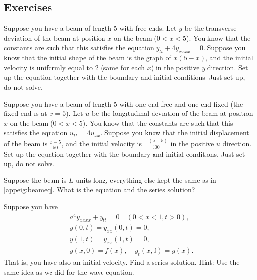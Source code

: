 \documentclass[12pt]{book}
\begin{document}
\subsection{Exercises}

\begin{exercise}
Suppose you have a beam of length 5 with free ends.  Let $y$ be the
transverse deviation of the beam at position $x$ on the beam ($0 < x < 5$).
You know that the
constants are such that this satisfies the equation $y_{tt} + 4 y_{xxxx} =
0$.   Suppose you know that the initial shape of the beam is the graph of
$x(5-x)$, and the initial velocity is uniformly equal to 2 (same for each $x$)
in the positive $y$ direction.  Set up the equation together with the
boundary and initial conditions.  Just set up, do not solve.
\end{exercise}

\begin{exercise}
Suppose you have a beam of length 5 with one end free and one end fixed
(the fixed end is at $x=5$).
Let $u$ be the
longitudinal deviation of the beam at position $x$ on the beam ($0 < x < 5$).
You know that the
constants are such that this satisfies the equation $u_{tt} = 4 u_{xx}$.
Suppose you know that the initial displacement of the beam
is $\frac{x-5}{50}$, and the initial velocity is $\frac{-(x-5)}{100}$
in the positive $u$ direction.  Set up the equation together with the
boundary and initial conditions.  Just set up, do not solve.
\end{exercise}

\begin{exercise}
Suppose the beam is $L$ units long, everything else kept the same
as in \eqref{appeig:beameq}.  What is the equation and the series
solution?
\end{exercise}

\begin{exercise}
Suppose you have 
\begin{equation*}
\begin{aligned}
& a^4 y_{xxxx} + y_{tt} = 0 \quad (0 < x < 1, t > 0) , \\
& y(0,t) = y_{xx}(0,t) = 0,\\
& y(1,t) = y_{xx}(1,t) = 0 ,\\
& y(x,0) = f(x), \quad y_{t}(x,0) = g(x) .
\end{aligned}
\end{equation*}
That is, you have also an initial velocity.  Find a series solution.  Hint:
Use the same idea as we did for the wave equation.
\end{exercise}
\end{document}
